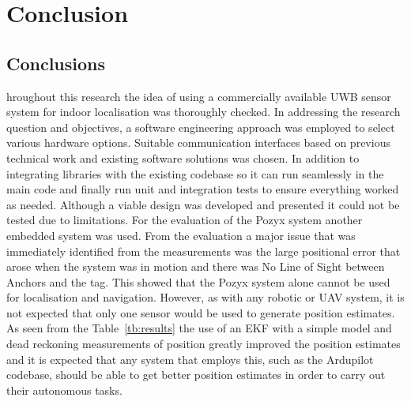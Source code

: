 \chapter{Conclusion}\label{ch:conclusion}
\section{Conclusions}\label{sec:conclusions}
hroughout this research the idea of using a commercially available UWB sensor system for indoor localisation was thoroughly checked.
In addressing the research question and objectives, a software engineering approach was employed to select various hardware options.
Suitable communication interfaces based on previous technical work and existing software solutions was chosen.
In addition to integrating libraries with the existing codebase so it can run seamlessly in the main code and finally run unit and integration tests to ensure everything worked as needed.
Although a viable design was developed and presented it could not be tested due to limitations.
For the evaluation of the Pozyx system another embedded system was used.
From the evaluation a major issue that was immediately identified from the measurements was the large positional error that arose when the system was in motion and there was No Line of Sight between Anchors and the tag.
This showed that the Pozyx system alone cannot be used for localisation and navigation.
However, as with any robotic or UAV system, it is not expected that only one sensor would be used to generate position estimates.
As seen from the Table~\ref{tb:results} the use of an EKF with a simple model and dead reckoning measurements of position greatly improved the position estimates and it is expected that any system that employs this, such as the Ardupilot codebase, should be able to get better position estimates in order to carry out
their autonomous tasks.

